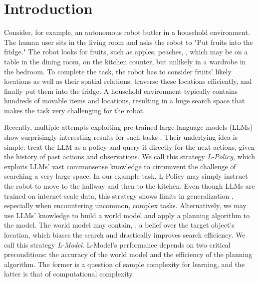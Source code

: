     \vspace{-7pt}
\section{Introduction}\label{sec:intro}
    \vspace{-5pt}

Consider, for example, an autonomous robot butler in a household
environment. The human user sits in the living room and asks the robot to
"Put fruits into the fridge." The robot looks for fruits, such as apples,
peaches, \etc, which may be on a table in the dining room, on the kitchen
counter, but unlikely in a wardrobe in the bedroom. To complete the task, the
robot has to consider fruits' likely locations as well as their spatial
relations, traverse these locations efficiently, and finally put them into the
fridge.
A household environment typically contains hundreds of movable items and locations, resulting in a huge search space that makes the task very challenging for the robot.

Recently, multiple attempts exploiting pre-trained large language models (LLMs) show surprisingly interesting results for such tasks \cite{li2022pre,huang2022language, ahn2022can, huang2022inner, brohan2022rt, zitkovich2023rt}. Their underlying idea is simple: treat the LLM as a policy and query it directly for the next actions, given the history of past actions and observations. We call this strategy \emph{L-Policy}, which exploits LLMs' vast commonsense knowledge to circumvent the challenge of searching a very large space. In our example task, L-Policy may simply instruct the robot to move to the hallway and then to the kitchen. 
Even though LLMs are trained on internet-scale data, this strategy shows
limits in generalization \cite{dziri2023faith, berglund2023reversal},
especially when encountering uncommon, complex tasks. Alternatively, we may
use LLMs' knowledge to build a world model and apply a planning algorithm to
the model. The world model may contain, \eg,  a belief over  the
target object's location,
which biases the search and drastically improves search efficiency. We call
this strategy \emph{L-Model}. L-Model's performance depends on two critical
preconditions: the accuracy of the world model and the efficiency of the
planning algorithm. The former is a question of sample complexity for
learning, and the latter is that of computational complexity.

